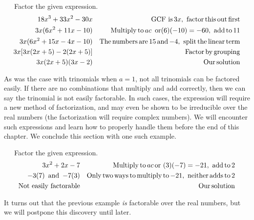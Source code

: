 \begin{example}~~~Factor the given expression.
  \begin{eqnarray*}
    18 x^3 + 33 x^2 - 30 x &  & \operatorname{GCF~is}3 x, \operatorname{~factor} \operatorname{this}
    \operatorname{out} \operatorname{first}\\
    3 x (6 x^2 + 11 x - 10) &  & \operatorname{Multiply} \operatorname{to} a c \operatorname{~or} (6)
    (- 10) = - 60, \operatorname{~add} \operatorname{to} 11\\
    3 x (6 x^2 + 15 x - 4 x - 10) &  & \operatorname{The} \operatorname{numbers} \operatorname{are} 15
    \operatorname{and} - 4, \operatorname{~split} \operatorname{the} \operatorname{linear} \operatorname{term}\\
    3 x [3 x (2 x + 5) - 2 (2 x + 5)] &  & \operatorname{Factor} \operatorname{by}
    \operatorname{grouping}\\
    3 x (2 x + 5) (3 x - 2) &  & \operatorname{Our} \operatorname{solution}
  \end{eqnarray*}
\end{example}


As was the case with trinomials when $a = 1$, not all trinomials can be
factored easily. If there are no combinations that multiply and add correctly, then we
can say the trinomial is not easily factorable.  In such cases, the expression will require a new method of factorization, and may even be shown to be irreducible over the real numbers (the factorization will require complex numbers).  We will encounter such expressions and learn how to properly handle them before the end of this chapter.  We conclude this section with one such example.
~\\
\begin{example}~~~Factor the given expression.
  \begin{eqnarray*}
    3 x^2 + 2 x - 7 &  & \operatorname{Multiply} \operatorname{to} a c \operatorname{or~} (3) (- 7) = -
    21, \operatorname{~add} \operatorname{to} 2\\
    - 3 (7) \operatorname{~and~} - 7 (3) &  & \operatorname{Only} \operatorname{two} \operatorname{ways}
    \operatorname{to} \operatorname{multiply} \operatorname{to} - 21, \operatorname{~neither} \operatorname{adds} \operatorname{to} 2\\
        \operatorname{Not~easily~factorable} &  & \operatorname{Our} \operatorname{solution}
  \end{eqnarray*}
\end{example}
  
It turns out that the previous example \textit{is} factorable over the real numbers, but we will postpone this discovery until later.
